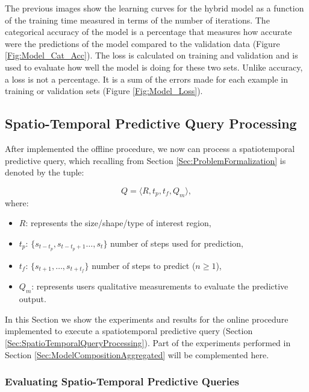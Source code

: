 The previous images show the learning curves for the hybrid model as a function of the training time measured in terms of the number of iterations. The categorical accuracy of the model is a percentage that measures how accurate were the predictions of the model compared to the validation data (Figure \ref{Fig:Model_Cat_Acc}). The loss is calculated on training and validation and is used to evaluate how well the model is doing for these two sets. Unlike accuracy, a loss is not a percentage. It is a sum of the errors made for each example in training or validation sets (Figure \ref{Fig:Model_Loss}).

\subsection{Spatio-Temporal Predictive Query Processing}
\label{Sec:SpatioTemporalPredictiveQuery}

After implemented the offline procedure, we now can process a spatiotemporal predictive query, which recalling from Section \ref{Sec:ProblemFormalization} is denoted by the tuple:

\begin{equation*} 
Q = \langle R, t_{p}, t_{f}, Q_{m} \rangle,
\end{equation*}
where:
\begin{itemize}[noitemsep,nolistsep]	
	\item $R$: represents the size/shape/type of interest region,
	\item $t_{p}$: $\{s_{t-t_p}, s_{t-t_{p}+1}\ldots, s_{t}\}$ number of steps used for  prediction,
	\item $t_{f}$: $\{s_{t+1}, \ldots, s_{t+t_f}\}$ number of steps to predict ($n\geq 1$),
	\item $Q_{m}$: represents users qualitative measurements to evaluate the predictive output.
\end{itemize}

In this Section we show the experiments and results for the online procedure implemented to execute a spatiotemporal predictive query (Section \ref{Sec:SpatioTemporalQueryProcessing}). Part of the experiments performed in Section \ref{Sec:ModelCompositionAggregated} will be complemented here.

\subsubsection{Evaluating Spatio-Temporal Predictive Queries}
\label{Sec:ExperimentsQueries}

